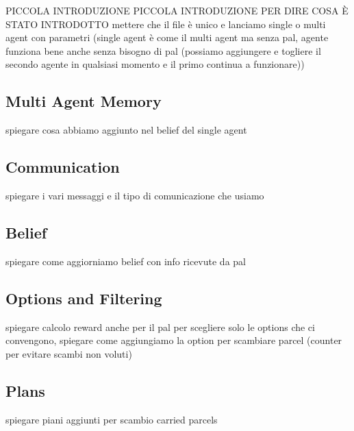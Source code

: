 
    PICCOLA INTRODUZIONE
    PICCOLA INTRODUZIONE PER DIRE COSA È STATO INTRODOTTO
    mettere che il file è unico e lanciamo single o multi agent con parametri (single agent è come il multi agent ma senza pal, agente funziona bene anche senza bisogno di pal (possiamo aggiungere e togliere il secondo agente in qualsiasi momento e il primo continua a funzionare))

    \subsection{Multi Agent Memory}
        spiegare cosa abbiamo aggiunto nel belief del single agent

    \subsection{Communication}
        spiegare i vari messaggi e il tipo di comunicazione che usiamo

    \subsection{Belief}
        spiegare come aggiorniamo belief con info ricevute da pal

    \subsection{Options and Filtering}
        spiegare calcolo reward anche per il pal per scegliere solo le options che ci convengono, spiegare come aggiungiamo la option per scambiare parcel (counter per evitare scambi non voluti)

    \subsection{Plans}
        spiegare piani aggiunti per scambio carried parcels 
        
